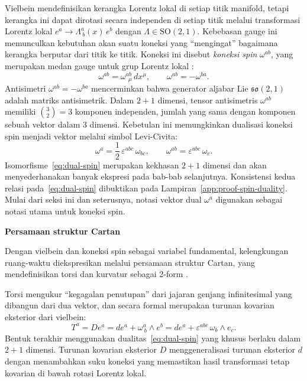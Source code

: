 Vielbein mendefinisikan kerangka Lorentz lokal di setiap titik manifold, tetapi kerangka ini dapat dirotasi secara independen di setiap titik melalui transformasi Lorentz lokal $e^a \to \Lambda^a_{\ b}(x)\, e^b$ dengan $\Lambda \in \mathrm{SO}(2,1)$. Kebebasan gauge ini memunculkan kebutuhan akan suatu koneksi yang ``mengingat'' bagaimana kerangka berputar dari titik ke titik. Koneksi ini disebut \textit{koneksi spin} $\omega^{ab}$, yang merupakan medan gauge untuk grup Lorentz lokal \cite{eguchi1980}:
\begin{equation}\label{eq:spin-connection}
    \omega^{ab} = \omega^{ab}_{\ \ \mu}\, dx^\mu, \qquad \omega^{ab} = -\omega^{ba}.
\end{equation}
Antisimetri $\omega^{ab} = -\omega^{ba}$ mencerminkan bahwa generator aljabar Lie $\mathfrak{so}(2,1)$ adalah matriks antisimetrik. Dalam $2+1$ dimensi, tensor antisimetris $\omega^{ab}$ memiliki $\binom{3}{2} = 3$ komponen independen, jumlah yang sama dengan komponen sebuah vektor dalam 3 dimensi. Kebetulan ini memungkinkan dualisasi koneksi spin menjadi vektor melalui simbol Levi-Civita:
\begin{equation}\label{eq:dual-spin}
    \omega^a = \frac{1}{2}\, \varepsilon^{abc}\, \omega_{bc}, \qquad \omega^{ab} = \varepsilon^{abc}\, \omega_c.
\end{equation}
Isomorfisme~\eqref{eq:dual-spin} merupakan kekhasan $2+1$ dimensi dan akan menyederhanakan banyak ekspresi pada bab-bab selanjutnya. Konsistensi kedua relasi pada~\eqref{eq:dual-spin} dibuktikan pada Lampiran~\ref{app:proof-spin-duality}. Mulai dari seksi ini dan seterusnya, notasi vektor dual $\omega^a$ digunakan sebagai notasi utama untuk koneksi spin.


\vspace{0.5em}
\noindent \textbf{Persamaan struktur Cartan}\label{subsec:cartan}

Dengan vielbein dan koneksi spin sebagai variabel fundamental, kelengkungan ruang-waktu diekspresikan melalui persamaan struktur Cartan, yang mendefinisikan torsi dan kurvatur sebagai 2-form \cite{eguchi1980, nakahara2003geometry}.

Torsi mengukur ``kegagalan penutupan'' dari jajaran genjang infinitesimal yang dibangun dari dua vektor, dan secara formal merupakan turunan kovarian eksterior dari vielbein:
\begin{equation}\label{eq:torsion}
    T^a = De^a = de^a + \omega^a_{\ b} \wedge e^b = de^a + \varepsilon^{abc}\, \omega_b \wedge e_c.
\end{equation}
Bentuk terakhir menggunakan dualitas~\eqref{eq:dual-spin} yang khusus berlaku dalam $2+1$ dimensi. Turunan kovarian eksterior $D$ menggeneralisasi turunan eksterior $d$ dengan menambahkan suku koneksi yang memastikan hasil transformasi tetap kovarian di bawah rotasi Lorentz lokal.

